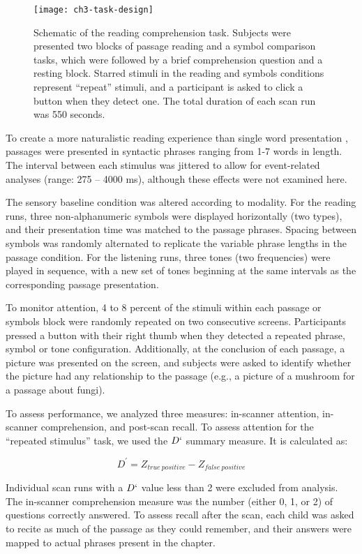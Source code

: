 \begin{figure}[t]
	\centering
	\texttt{[image: ch3-task-design]}
	\caption[Schematic of the reading comprehension task]{Schematic of the reading comprehension task. Subjects were presented two blocks of passage reading and a symbol comparison tasks, which were followed by a brief comprehension question and a resting block. Starred stimuli in the reading and symbols conditions represent ``repeat'' stimuli, and a participant is asked to click a button when they detect one. The total duration of each scan run was 550 seconds.}
	\label{fig:ch3-task-design}
\end{figure}

To create a more naturalistic reading experience than single word presentation \citep{Rayner1998}, passages were presented in syntactic phrases ranging from 1-7 words in length. The interval between each stimulus was jittered to allow for event-related analyses (range: 275 – 4000 ms), although these effects were not examined here.

The sensory baseline condition was altered according to modality. For the reading runs, three non-alphanumeric symbols were displayed horizontally (two types), and their presentation time was matched to the passage phrases. Spacing between symbols was randomly alternated to replicate the variable phrase lengths in the passage condition. For the listening runs, three tones (two frequencies) were played in sequence, with a new set of tones beginning at the same intervals as the corresponding passage presentation. 

To monitor attention, 4 to 8 percent of the stimuli within each passage or symbols block were randomly repeated on two consecutive screens.  Participants pressed a button with their right thumb when they detected a repeated phrase, symbol or tone configuration. Additionally, at the conclusion of each passage, a picture was presented on the screen, and subjects were asked to identify whether the picture had any relationship to the passage (e.g., a picture of a mushroom for a passage about fungi). 

To assess performance, we analyzed three measures: in-scanner attention, in-scanner comprehension, and post-scan recall. To assess attention for the ``repeated stimulus'' task, we used the $D`$ summary measure. It is calculated as:

$$
D^\prime = Z_{true\ positive} - Z_{false\ positive}
$$

Individual scan runs with a $D`$ value less than 2 were excluded from analysis. The in-scanner comprehension measure was the number (either 0, 1, or 2) of questions correctly answered. To assess recall after the scan, each child was asked to recite as much of the passage as they could remember, and their answers were mapped to actual phrases present in the chapter. 

